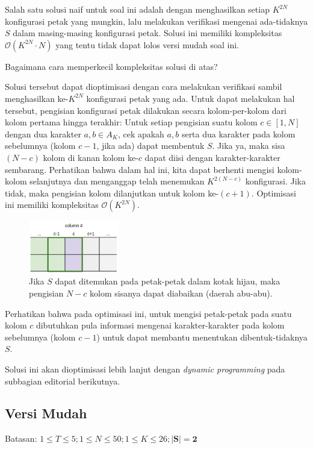 \documentclass[../main_editorial.tex]{subfiles} %
\newcommand{\bigO}[1]{\mathcal{O}(#1)}
\begin{document}
Salah satu solusi naif untuk soal ini adalah dengan menghasilkan setiap $K^{2N}$ konfigurasi petak yang mungkin, lalu melakukan verifikasi mengenai ada-tidaknya $ S $ dalam masing-masing konfigurasi petak. Solusi ini memiliki kompleksitas $ \bigO{K^{2N}\cdot N} $ yang tentu tidak dapat lolos versi mudah soal ini.

Bagaimana cara memperkecil kompleksitas solusi di atas?

Solusi tersebut dapat dioptimisasi dengan cara melakukan verifikasi sambil menghasilkan ke-$ K^{2N} $ konfigurasi petak yang ada. Untuk dapat melakukan hal tersebut, pengisian konfigurasi petak dilakukan secara kolom-per-kolom dari kolom pertama hingga terakhir: Untuk setiap pengisian suatu kolom $ c \in [1, N] $ dengan dua karakter $ a, b \in A_K $, cek apakah $ a, b $ serta dua karakter pada kolom sebelumnya (kolom $ c - 1 $, jika ada) dapat membentuk $ S $. Jika ya, maka sisa $ (N-c) $ kolom di kanan kolom ke-$ c $ dapat diisi dengan karakter-karakter sembarang. Perhatikan bahwa dalam hal ini, kita dapat berhenti mengisi kolom-kolom selanjutnya dan menganggap telah menemukan $ K^{2(N-c)} $ konfigurasi. Jika tidak, maka pengisian kolom dilanjutkan untuk kolom ke-$ (c + 1) $. Optimisasi ini memiliki kompleksitas $ \bigO{K^{2N}} $.

\begin{figure}[!h]
	\centering
	\includegraphics[width=0.35\textwidth]{scrabble/imgs/scrabble-per-column}
		\captionsetup{width=0.8\textwidth}
	\caption{Jika $ S $ dapat ditemukan pada petak-petak dalam kotak hijau, maka pengisian $ N-c $ kolom sisanya dapat diabaikan (daerah abu-abu).}
\end{figure}

Perhatikan bahwa pada optimisasi ini, untuk mengisi petak-petak pada suatu kolom $ c $ dibutuhkan pula informasi mengenai karakter-karakter pada kolom sebelumnya (kolom $ c - 1 $) untuk dapat membantu menentukan dibentuk-tidaknya $ S $.

Solusi ini akan dioptimisasi lebih lanjut dengan \textit{dynamic programming} pada subbagian editorial berikutnya.

\subsection*{Versi Mudah}
Batasan: $1 \le T \le 5; 1 \le N \le 50; 1 \le K \le 26; \mathbf{|S| = 2}$
\end{document}
